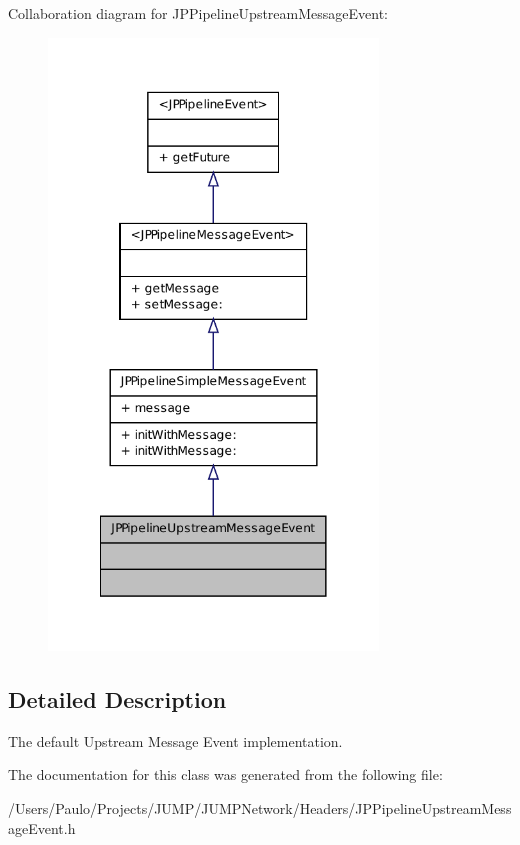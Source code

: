 Collaboration diagram for JPPipelineUpstreamMessageEvent:\nopagebreak
\begin{figure}[H]
\begin{center}
\leavevmode
\includegraphics[width=248pt]{a00156}
\end{center}
\end{figure}


\subsection{Detailed Description}
The default Upstream Message Event implementation. 

The documentation for this class was generated from the following file:\begin{DoxyCompactItemize}
\item 
/Users/Paulo/Projects/JUMP/JUMPNetwork/Headers/JPPipelineUpstreamMessageEvent.h\end{DoxyCompactItemize}
